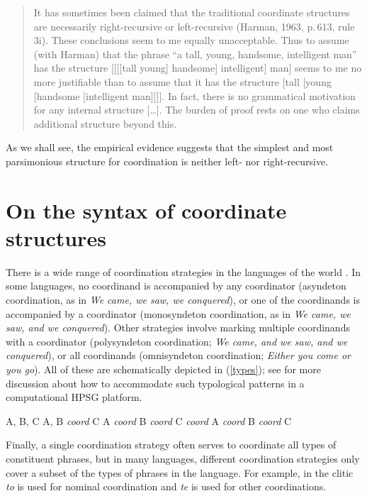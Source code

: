 \begin{quote}
It has sometimes been claimed that the traditional coordinate structures are necessarily
right-recursive \citep{Yngve60a-u} or left-recursive (Harman, 1963, p.\,613, rule 3i). These
conclusions seem to me equally unacceptable. Thus to assume (with Harman) that the phrase ``a tall,
young, handsome, intelligent man'' has the structure [[[[tall young] handsome] intelligent] man]
seems to me no more justifiable than to assume that it has the structure [tall [young [handsome
[intelligent man]]]]. In fact, there is no grammatical motivation for any internal structure
[\ldots]. The burden of proof rests on one who claims additional structure beyond
this. \citep[196--197]{chom65} 
\end{quote}

\noindent
As we shall see, the empirical evidence suggests that
the simplest and most parsimonious structure for coordination is neither left- nor right-recursive.


\section{On the syntax of coordinate structures}


There is a wide range of coordination strategies in the languages of the world \citep{haspelmath}. In some languages, no coordinand is accompanied by any coordinator (asyndeton coordination, as in \emph{We came, we saw, we conquered}), or one of the coordinands is accompanied by a coordinator (monosyndeton coordination,  as in \emph{We came, we saw, and we conquered}). Other strategies involve marking multiple coordinands with a coordinator (polysyndeton coordination;
\emph{We came, and we saw, and we conquered}), or all coordinands (omnisyndeton coordination;
\emph{Either you come or you go}).
All of these are schematically depicted in (\ref{types}); see
 \citet{Drellishak:Bender:05} for more discussion about how to accommodate such typological patterns in a computational HPSG platform.

\eal
\label{types}
\settowidth{}
\ex A, B, C                                      
\ex A, B \emph{coord} C                          
\ex A \emph{coord} B \emph{coord} C              
\ex \emph{coord} A \emph{coord} B \emph{coord} C 
\zl


\noindent
 Finally, a single coordination strategy often serves to coordinate all types of constituent phrases, but in many languages, different coordination strategies only cover a subset of the types of phrases in the language. For example, in
 the clitic \emph{to} is used for nominal coordination
and \emph{te} is used for other coordinations.


